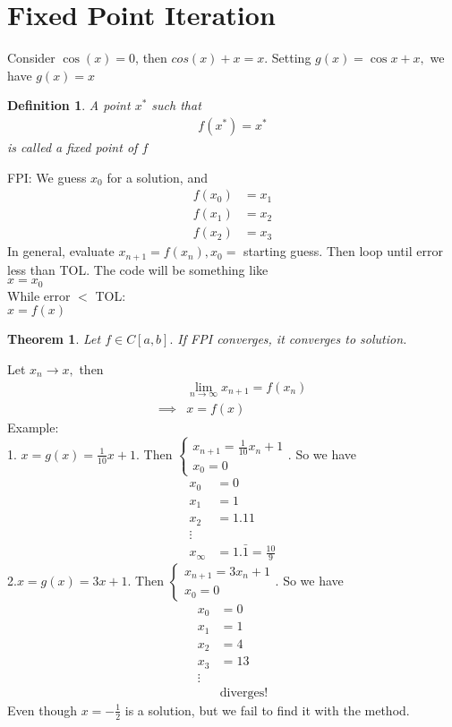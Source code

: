 \documentclass[11pt,oneside]{book}
\theoremstyle{break}
\theoremstyle{break}
\newtheorem{thm}{Theorem}[section]
\newtheorem{defn}{Definition}[corL]
\newcommand{\example}{\color{purple}Example: \color{black}}
\begin{document}
\section[Fixed Point Iteration]{Fixed Point Iteration}
Consider $\cos(x)=0$, then $cos(x)+x=x$. Setting $g(x)=\cos x +x,$ we have $g(x)=x$ \begin{defn}
A point $x^*$ such that \begin{align*}
f(x^*)=x^*
\end{align*}
is called a fixed point of $f$
\end{defn}
FPI: We guess $x_0$ for a solution, and \begin{align*}
f(x_0)&=x_1\\
f(x_1)&=x_2\\
f(x_2)&=x_3
\end{align*}
In general, evaluate $x_{n+1}=f(x_n),x_0=$ starting guess. Then loop until error less than TOL. The code will be something like \\
\text{\qquad} $x=x_0$\\
\text{\qquad} While error $<$ TOL:\\
\text{\qquad} \text{\qquad} $x=f(x)$\\
\begin{thm}
Let $f\in C[a,b].$ If FPI converges, it converges to solution.
\end{thm}
Let $x_n\to x,$ then \begin{align*}
&\lim_{n\to \infty} x_{n+1}=f(x_n)\\
\implies& x=f(x)
\end{align*}
\example \\
1. $x=g(x)=\frac{1}{10}x+1$. Then $\begin{cases}
x_{n+1}=\frac{1}{10}x_n+1\\
x_0=0
\end{cases}$. So we have \begin{align*}
x_0&=0\\
x_1&=1\\
x_2&=1.11\\
\vdots\\
x_{\infty}&=1.\bar{1}=\frac{10}{9}
\end{align*}
2.$x=g(x)=3x+1$. Then $\begin{cases}
x_{n+1}=3x_n+1\\
x_0=0
\end{cases}$. So we have \begin{align*}
x_0&=0\\
x_1&=1\\
x_2&=4\\
x_3&=13\\
\vdots\\
&\text{diverges!}
\end{align*}
Even though $x=-\frac{1}{2}$ is a solution, but we fail to find it with the method.\\
\end{document}
